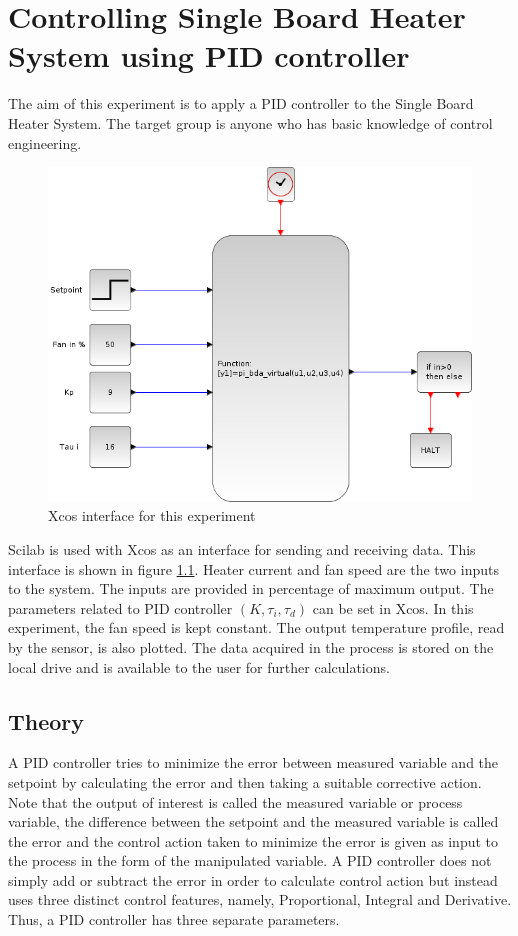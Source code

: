 \chapter {Controlling Single Board Heater System using PID controller}
The aim of this experiment is to apply a PID controller to the Single Board Heater System. 
The target group is anyone who has basic knowledge of control engineering.\\
\begin{figure}
\centering
\includegraphics[width=0.7\linewidth]{pid_manual/pid_xcos.png}
\caption{Xcos interface for this experiment}
\label{Xcos_pid}
\end{figure}
Scilab is used with Xcos as an interface for sending and receiving data. 
This interface is shown in figure \ref{Xcos_pid}. Heater current and fan speed are the two inputs to the system. 
The inputs are provided in percentage of maximum output. The parameters related to PID controller $(K,\tau_i,\tau_d)$ can be set in Xcos. 
In this experiment, the fan speed is kept constant. The output temperature profile, read by the sensor, is also plotted. 
The data acquired in the process is stored on the local drive and is available to the user for further calculations.
\section{Theory}
A PID controller tries to minimize the error between measured variable and the setpoint by calculating the error 
and then taking a suitable corrective action. Note that the output of interest is called the measured variable or process 
variable, the difference between the setpoint and the measured variable is called the error and the control action taken 
to minimize the error is given as input to the process in the form of the manipulated variable. A PID controller does 
not simply add or subtract the error in order to calculate control action but instead uses three distinct control features, 
namely, Proportional, Integral and Derivative. Thus, a PID controller has three separate parameters.
